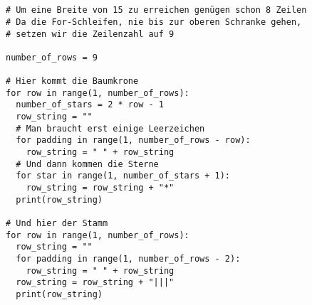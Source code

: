 \documentclass[a4paper]{article}
\begin{document}
\section{}
\begin{verbatim}
# Um eine Breite von 15 zu erreichen genügen schon 8 Zeilen
# Da die For-Schleifen, nie bis zur oberen Schranke gehen,
# setzen wir die Zeilenzahl auf 9

number_of_rows = 9

# Hier kommt die Baumkrone
for row in range(1, number_of_rows):
  number_of_stars = 2 * row - 1
  row_string = ""
  # Man braucht erst einige Leerzeichen
  for padding in range(1, number_of_rows - row):
    row_string = " " + row_string
  # Und dann kommen die Sterne
  for star in range(1, number_of_stars + 1):
    row_string = row_string + "*"
  print(row_string)

# Und hier der Stamm
for row in range(1, number_of_rows):
  row_string = ""
  for padding in range(1, number_of_rows - 2):
    row_string = " " + row_string
  row_string = row_string + "|||"
  print(row_string)

\end{verbatim}
\end{document}
